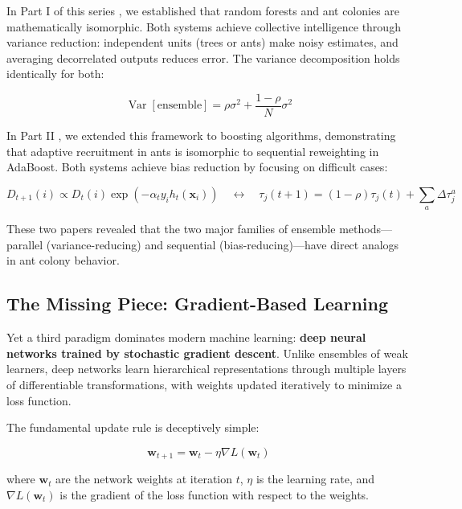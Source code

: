 \documentclass[12pt,letterpaper]{article}
\DeclareMathOperator{\Var}{Var}
\begin{document}
In Part I of this series \citep{fokoue2025decorrelation}, we established that random forests and ant colonies are mathematically isomorphic. Both systems achieve collective intelligence through variance reduction: independent units (trees or ants) make noisy estimates, and averaging decorrelated outputs reduces error. The variance decomposition holds identically for both:

\begin{equation}
\Var[\text{ensemble}] = \rho\sigma^2 + \frac{1-\rho}{N}\sigma^2 \label{eq:variance_decomp}
\end{equation}

In Part II \citep{fokoue2025boosting}, we extended this framework to boosting algorithms, demonstrating that adaptive recruitment in ants is isomorphic to sequential reweighting in AdaBoost. Both systems achieve bias reduction by focusing on difficult cases:

\begin{equation}
D_{t+1}(i) \propto D_t(i) \exp(-\alpha_t y_i h_t(\mathbf{x}_i)) \quad \longleftrightarrow \quad \tau_j(t+1) = (1-\rho)\tau_j(t) + \sum_a \Delta \tau_j^a \label{eq:boosting_update}
\end{equation}

These two papers revealed that the two major families of ensemble methods---parallel (variance-reducing) and sequential (bias-reducing)---have direct analogs in ant colony behavior.

\subsection{The Missing Piece: Gradient-Based Learning}

Yet a third paradigm dominates modern machine learning: \textbf{deep neural networks trained by stochastic gradient descent}. Unlike ensembles of weak learners, deep networks learn hierarchical representations through multiple layers of differentiable transformations, with weights updated iteratively to minimize a loss function.

The fundamental update rule is deceptively simple:

\begin{equation}
\mathbf{w}_{t+1} = \mathbf{w}_t - \eta \nabla L(\mathbf{w}_t) \label{eq:gradient_descent}
\end{equation}

where $\mathbf{w}_t$ are the network weights at iteration $t$, $\eta$ is the learning rate, and $\nabla L(\mathbf{w}_t)$ is the gradient of the loss function with respect to the weights.
\end{document}
